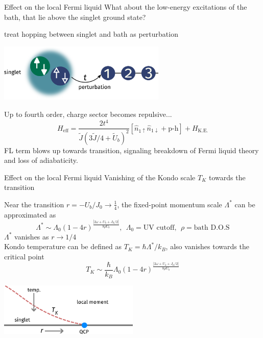 \documentclass[8pt,aspectratio=169]{beamer}
\begin{document}
\begin{frame}{Effect on the local Fermi liquid}
What about the \alert{low-energy excitations} of the bath, that lie above the singlet ground state?
\begin{itemize}
\nitem treat hopping between singlet and bath as perturbation 
\begin{center}
\includegraphics[width=0.6\textwidth]{perturbation.pdf}
\end{center}
\nitem Up to fourth order, charge sector becomes repulsive...
	\[H_\text{eff} = \frac{2t^4}{\tilde J\left(3\tilde J/4 + \tilde U_b \right)^2}\left[\hat n_{1 \uparrow}\hat n_{1 \downarrow} + \text{p-h}\right]  + H_\text{K.E.}\]
\nitem FL term blows up towards transition, signaling \alert{breakdown} of Fermi liquid theory and loss of adiabaticity.
\end{itemize}
\end{frame}

\begin{frame}{Effect on the local Fermi liquid}
Vanishing of the \alert{Kondo scale} \(T_K\) towards the transition
\vspace*{\fill}

\begin{itemize}
	\nitem Near the transition \(r = -U_b/J_0 \to \frac{1}{4}\), the fixed-point momentum scale \(\Lambda^*\) can be approximated as
	\[\Lambda^* \sim \Lambda_0 \left(1 - 4r\right)^{\frac{|2\omega + U_b + J_0/2|}{8 \rho U_b}}, ~ ~ \Lambda_0 = \text{UV cutoff}, ~ ~ \rho = \text{bath D.O.S}\]
	\nitem \(\Lambda^*\) vanishes as \(r \to 1/4\)\\[10pt]
	\nitem Kondo temperature can be defined as \(T_K = \hbar \Lambda^*/k_B\), also vanishes towards the critical point
	\[T_K \sim \frac{\hbar}{k_B}\Lambda_0 \left(1 - 4r\right)^{\frac{|2\omega + U_b + J_0/2|}{8 \rho U_b}}\]
\end{itemize}
\includegraphics[width=0.5\textwidth]{Tk.pdf}
\end{frame}
\end{document}
